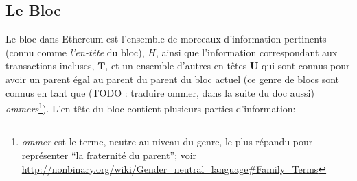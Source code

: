\documentclass[9pt,oneside]{amsart}
\begin{document}
\begin{multicols}{2}
\subsection{Le Bloc} \label{ch:block}


Le bloc dans Ethereum est l'ensemble de morceaux d'information pertinents (connu comme \textit{l'en-tête} du bloc), $H$, ainsi que l'information correspondant aux transactions incluses, $\mathbf{T}$, et un ensemble d'autres en-têtes $\mathbf{U}$ qui sont connus pour avoir un parent égal au parent du parent du bloc actuel  (ce genre de blocs sont connus en tant que (TODO : traduire ommer, dans la suite du doc aussi) \textit{ommers}\footnote{\textit{ommer} est le terme, neutre au niveau du genre, le plus répandu pour représenter ``la fraternité du parent''; voir \url{http://nonbinary.org/wiki/Gender_neutral_language#Family_Terms}}). L'en-tête du bloc contient plusieurs parties d'information:




\end{multicols}
\end{document}
